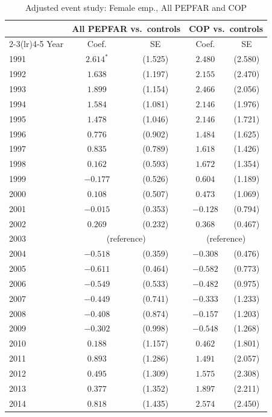 \begin{table}[htbp]
\centering
\small
\caption{Adjusted event study: Female emp., All PEPFAR and COP}
\label{tab:crown_es_combined_emp_female}
\begin{tabular}{lcccc}
\toprule
 & \multicolumn{2}{c}{All PEPFAR vs.\ controls} & \multicolumn{2}{c}{COP vs.\ controls} \\
\cmidrule(lr){2-3}\cmidrule(lr){4-5}
Year & Coef. & SE & Coef. & SE \\
\midrule
1991 & $2.614^{*}$ & (1.525) & $2.480$ & (2.580) \\
1992 & $1.638$ & (1.197) & $2.155$ & (2.470) \\
1993 & $1.899$ & (1.154) & $2.466$ & (2.056) \\
1994 & $1.584$ & (1.081) & $2.146$ & (1.976) \\
1995 & $1.478$ & (1.046) & $2.146$ & (1.721) \\
1996 & $0.776$ & (0.902) & $1.484$ & (1.625) \\
1997 & $0.835$ & (0.789) & $1.618$ & (1.426) \\
1998 & $0.162$ & (0.593) & $1.672$ & (1.354) \\
1999 & $-0.177$ & (0.526) & $0.604$ & (1.189) \\
2000 & $0.108$ & (0.507) & $0.473$ & (1.069) \\
2001 & $-0.015$ & (0.353) & $-0.128$ & (0.794) \\
2002 & $0.269$ & (0.232) & $0.368$ & (0.467) \\
2003 & \multicolumn{2}{c}{(reference)} & \multicolumn{2}{c}{(reference)} \\
2004 & $-0.518$ & (0.359) & $-0.308$ & (0.476) \\
2005 & $-0.611$ & (0.464) & $-0.582$ & (0.773) \\
2006 & $-0.549$ & (0.533) & $-0.482$ & (0.975) \\
2007 & $-0.449$ & (0.741) & $-0.333$ & (1.233) \\
2008 & $-0.408$ & (0.874) & $-0.157$ & (1.203) \\
2009 & $-0.302$ & (0.998) & $-0.548$ & (1.268) \\
2010 & $0.188$ & (1.157) & $0.462$ & (1.801) \\
2011 & $0.893$ & (1.286) & $1.491$ & (2.057) \\
2012 & $0.495$ & (1.309) & $1.575$ & (2.308) \\
2013 & $0.377$ & (1.352) & $1.897$ & (2.211) \\
2014 & $0.818$ & (1.435) & $2.574$ & (2.450) \\

\end{tabular}
\end{table}
